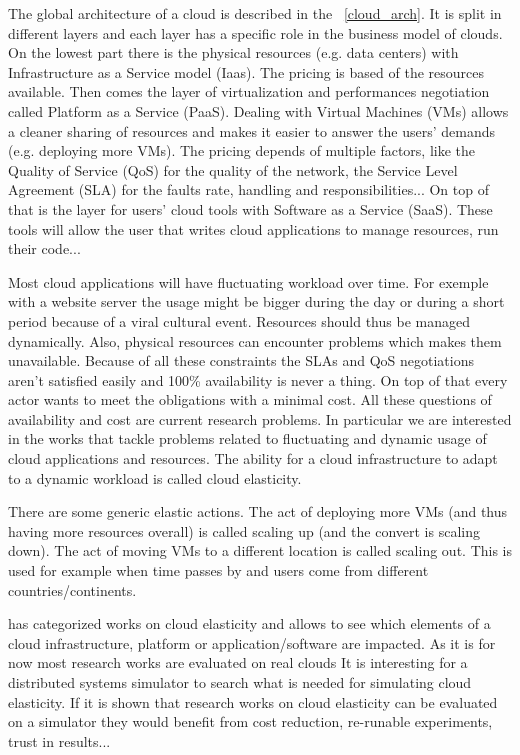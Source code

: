 \documentclass[a4paper]{IEEEtran}
\begin{document}
  The global architecture of a cloud is described in the 
  \figurename~\ref{cloud_arch}. It is split in different layers and each layer 
  has a specific role in the business model of clouds. On the lowest part there 
  is the physical resources (e.g. data centers) with Infrastructure as a 
  Service model (Iaas). The pricing is based of the resources available. Then 
  comes the layer of virtualization and performances negotiation called 
  Platform as a Service (PaaS). Dealing with Virtual Machines (VMs) allows a 
  cleaner sharing of resources and makes it easier to answer the users' demands 
  (e.g. deploying more VMs). The pricing depends of multiple factors, like the 
  Quality of Service (QoS) for the quality of the network, the Service Level 
  Agreement (SLA) for the faults rate, handling and responsibilities... On top 
  of that is the layer for users' cloud tools with Software as a Service 
  (SaaS). These tools will allow the user that writes cloud applications to 
  manage resources, run their code...
  
  Most cloud applications will have fluctuating workload over time. For exemple 
  with a website server the usage might be bigger during the day or during a 
  short period because of a viral cultural event. Resources should thus be 
  managed dynamically. Also, physical resources can encounter problems which 
  makes them unavailable. Because of all these constraints the SLAs and QoS 
  negotiations aren't satisfied easily and 100\% availability is never a thing. 
  On top of that every actor wants to meet the obligations with a minimal cost. 
  All these questions of availability and cost are current research problems. 
  In particular we are interested in the works that tackle problems related to 
  fluctuating and dynamic usage of cloud applications and resources. The 
  ability for a cloud infrastructure to adapt to a dynamic workload is called 
  cloud elasticity.
  
  There are some generic elastic actions. The act of deploying more VMs (and
  thus having more resources overall) is called scaling up (and the convert is
  scaling down). The act of moving VMs to a different location is called scaling
  out. This is used for example when time passes by and users come from
  different countries/continents.
  
  \cite{Naskos2016} has categorized works on cloud elasticity and allows to see
  which elements of a cloud infrastructure, platform or application/software are
  impacted. As it is for now most research works are evaluated on real clouds It
  is interesting for a distributed systems simulator to search what is needed
  for simulating cloud elasticity. If it is shown that research works on cloud
  elasticity can be evaluated on a simulator they would benefit from cost
  reduction, re-runable experiments, trust in results...
  
\end{document}
